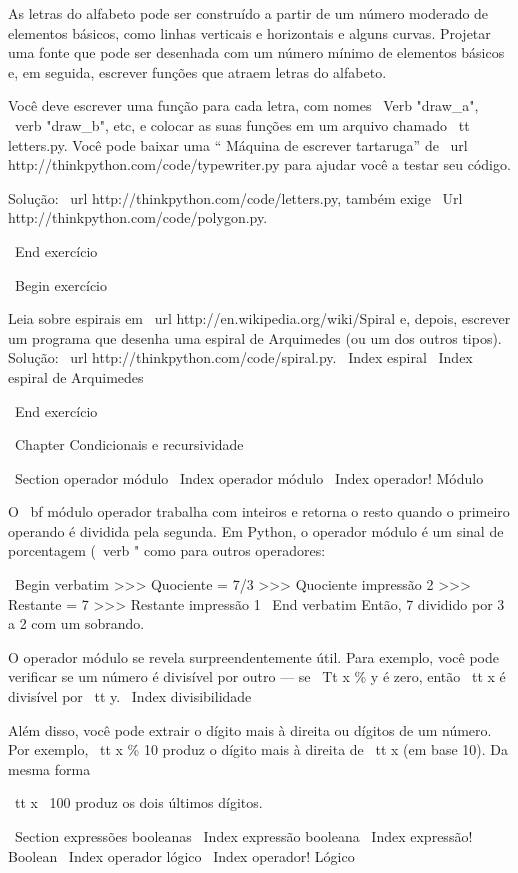 \documentclass[10pt]{book}
\begin{document}
\begin {itemize}
{As letras do alfabeto pode ser construído a partir de um número moderado
de elementos básicos, como linhas verticais e horizontais e alguns
curvas. Projetar uma fonte que pode ser desenhada com um número mínimo de
elementos básicos e, em seguida, escrever funções que atraem letras do
alfabeto.

Você deve escrever uma função para cada letra, com nomes
\ Verb "draw_a", \ verb "draw_b", etc, e colocar as suas funções
em um arquivo chamado {\ tt letters.py}. Você pode baixar uma
`` Máquina de escrever tartaruga'' de \ url {http://thinkpython.com/code/typewriter.py}
para ajudar você a testar seu código.

Solução: \ url {} http://thinkpython.com/code/letters.py, também exige
\ Url {http://thinkpython.com/code/polygon.py}.

\ End {} exercício

\ Begin {} exercício

Leia sobre espirais em \ url {http://en.wikipedia.org/wiki/Spiral} e, depois,
escrever um programa que desenha uma espiral de Arquimedes (ou um dos outros
tipos). Solução: \ url {http://thinkpython.com/code/spiral.py}.
\ Index {espiral}
\ Index {espiral de Arquimedes} 

\ End {} exercício


\ Chapter {Condicionais e recursividade}

\ Section {operador módulo}
\ Index {operador módulo}
\ Index {operador! Módulo}

O {\ bf módulo operador} trabalha com inteiros e retorna o resto
quando o primeiro operando é dividida pela segunda. Em Python, o
operador módulo é um sinal de porcentagem (\ verb "%
como para outros operadores:

\ Begin {verbatim}
>>> Quociente = 7/3
>>> Quociente impressão
2
>>> Restante = 7%
>>> Restante impressão
1
\ End {verbatim}
%
Então, 7 dividido por 3 a 2 com um sobrando.

O operador módulo se revela surpreendentemente útil. Para
exemplo, você pode verificar se um número é divisível por outro --- se
{\ Tt x \% y} é zero, então {\ tt x} é divisível por {\ tt y}.
\ Index {divisibilidade}

Além disso, você pode extrair o dígito mais à direita
ou dígitos de um número. Por exemplo, {\ tt x \% 10} produz o
dígito mais à direita de {\ tt x} (em base 10). Da mesma forma {\ tt x \ 100%
produz os dois últimos dígitos.


\ Section {} expressões booleanas
\ Index {expressão booleana}
\ Index {expressão! Boolean}
\ Index {operador lógico}
\ Index {operador! Lógico}

}}
\end{itemize}
\end{document}
